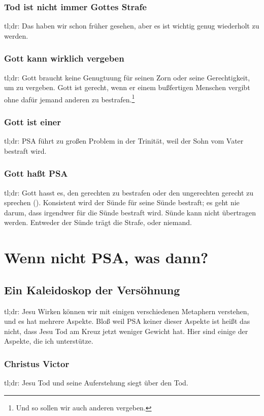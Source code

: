 \documentclass[12pt]{report}
\begin{document}
\section{Tod ist nicht immer Gottes Strafe}
tl;dr:
Das haben wir schon früher gesehen, aber es ist wichtig genug wiederholt zu werden.

\section{Gott kann wirklich vergeben}
tl;dr:
Gott braucht keine Genugtuung für seinen Zorn oder seine Gerechtigkeit, um zu vergeben.
Gott ist gerecht, wenn er einem bußfertigen Menschen vergibt ohne dafür jemand anderen zu bestrafen.\footnote{
Und so sollen wir auch anderen vergeben.}

\section{Gott ist einer}
tl;dr:
PSA führt zu großen Problem in der Trinität, weil der Sohn vom Vater bestraft wird.

\section{Gott haßt PSA}
tl;dr:
Gott hasst es, den gerechten zu bestrafen oder den ungerechten gerecht zu sprechen ().
Konsistent wird der Sünde für seine Sünde bestraft; es geht nie darum, dass irgendwer für die Sünde bestraft wird.
Sünde kann nicht übertragen werden. Entweder der Sünde trägt die Strafe, oder niemand.



\pagebreak
\part{Wenn nicht PSA, was dann?}
\chapter{Ein Kaleidoskop der Versöhnung}
tl;dr:
Jesu Wirken können wir mit einigen verschiedenen Metaphern verstehen, und es hat mehrere Aspekte.
Bloß weil PSA keiner dieser Aspekte ist heißt das nicht, dass Jesu Tod am Kreuz jetzt weniger Gewicht hat.
Hier sind einige der Aspekte, die ich unterstütze.

\section{Christus Victor}
tl;dr:
Jesu Tod und seine Auferstehung siegt über den Tod.
\end{document}
